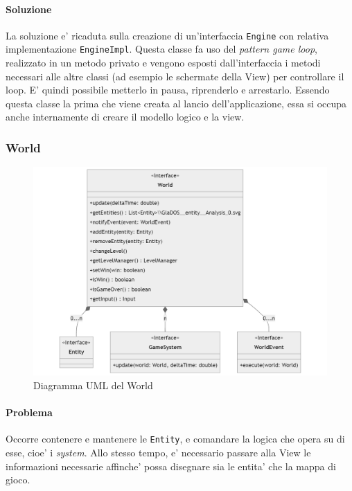 \documentclass[a4paper,12pt]{report}
\begin{document}
\paragraph*{Soluzione} La soluzione e' ricaduta sulla creazione di un'interfaccia \texttt{Engine} con relativa implementazione \texttt{EngineImpl}. Questa classe fa uso del \textit{pattern game loop}, realizzato in un metodo privato e vengono esposti dall'interfaccia i metodi necessari alle altre classi (ad esempio le schermate della View) per controllare il loop. E' quindi possibile metterlo in pausa, riprenderlo e arrestarlo. Essendo questa classe la prima che viene creata al lancio dell'applicazione, essa si occupa anche internamente di creare il modello logico e la view.

\subsubsection{World}

\begin{figure}[h]
	\centering
	\includegraphics[width=\textwidth]{uml/uml_world.png}
	\caption{Diagramma UML del World}
	\label{img:badarch}
\end{figure}

\paragraph*{Problema}
Occorre contenere e mantenere le \texttt{Entity}, e comandare la logica che opera su di esse, cioe' i \textit{system}. Allo stesso tempo, e' necessario passare alla View le informazioni necessarie affinche' possa disegnare sia le entita' che la mappa di gioco. 
\end{document}
